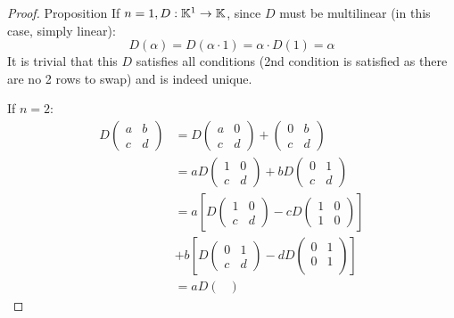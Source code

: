 \begin{proof} {Proposition}
    If \(n=1, D: \mathbb{K}^1 \to \mathbb{K}\), since \(D\) must be multilinear (in this case, simply linear):
    \[
    D (\alpha) = D(\alpha \cdot 1) = \alpha \cdot D(1) = \alpha
    \]
    It is trivial that this \(D\) satisfies all conditions (2nd condition is satisfied as there are no 2 rows to swap) and is indeed unique.

    If \(n=2\):
    \begin{align*}
        D\begin{pmatrix}
        a & b \\
        c & d
        \end{pmatrix} &= D\begin{pmatrix}
        a & 0 \\
        c & d
        \end{pmatrix} + \begin{pmatrix}
        0 & b \\
        c & d
        \end{pmatrix} \\
        &= a D\begin{pmatrix}
        1 & 0 \\
        c & d
        \end{pmatrix} + bD\begin{pmatrix}
        0 & 1 \\
        c & d
        \end{pmatrix}\\
        &= a\left[D\begin{pmatrix}
        1 & 0 \\
        c & d
        \end{pmatrix} - cD\begin{pmatrix}
        1 & 0 \\
        1 & 0
        \end{pmatrix}\right]\\
        &+ b\left[D\begin{pmatrix}
            0 & 1 \\
            c & d
            \end{pmatrix} - dD\begin{pmatrix}
            0 & 1\\
            0 & 1\\
            \end{pmatrix}\right] \\
            &= aD\begin{pmatrix}

\end{pmatrix}
\end{align*}
\end{proof}
